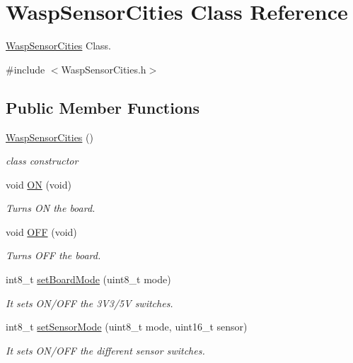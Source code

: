 \hypertarget{class_wasp_sensor_cities}{}\section{Wasp\+Sensor\+Cities Class Reference}
\label{class_wasp_sensor_cities}


\hyperlink{class_wasp_sensor_cities}{Wasp\+Sensor\+Cities} Class.  




{\ttfamily \#include $<$Wasp\+Sensor\+Cities.\+h$>$}

\subsection*{Public Member Functions}
\begin{DoxyCompactItemize}
\item 
\hyperlink{class_wasp_sensor_cities_a8f5ce2155eafb8ebe732e946443d7174}{Wasp\+Sensor\+Cities} ()
\begin{DoxyCompactList}\small\item\em class constructor \end{DoxyCompactList}\item 
void \hyperlink{class_wasp_sensor_cities_ad504a0572a9039674f364aa7f964394e}{ON} (void)
\begin{DoxyCompactList}\small\item\em Turns ON the board. \end{DoxyCompactList}\item 
void \hyperlink{class_wasp_sensor_cities_a065eb04d2af79f52b45aa5c9dfa6017b}{O\+FF} (void)
\begin{DoxyCompactList}\small\item\em Turns O\+FF the board. \end{DoxyCompactList}\item 
int8\+\_\+t \hyperlink{class_wasp_sensor_cities_a3ac9a9dcd0ea8f591f15a27940dfed19}{set\+Board\+Mode} (uint8\+\_\+t mode)
\begin{DoxyCompactList}\small\item\em It sets O\+N/\+O\+FF the 3\+V3/5V switches. \end{DoxyCompactList}\item 
int8\+\_\+t \hyperlink{class_wasp_sensor_cities_a9fff43ca0600a66b4c3862cf303e2ad3}{set\+Sensor\+Mode} (uint8\+\_\+t mode, uint16\+\_\+t sensor)
\begin{DoxyCompactList}\small\item\em It sets O\+N/\+O\+FF the different sensor switches. \end{DoxyCompactList}\item 

\end{DoxyCompactItemize}
